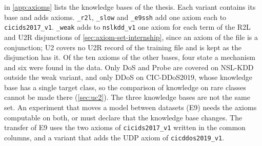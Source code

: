  in \cref{app:axioms} lists the knowledge bases of the thesis.
Each variant contains its base and adds axioms. \texttt{\_r2l}, \texttt{\_slow} and
\texttt{\_e9ssh} add one axiom each to \texttt{cicids2017\_v1}. \texttt{\_weak} adds to
\texttt{nslkdd\_v1} one axiom for each term of the R2L and U2R disjunctions of
\cref{sec:axiom-set-internship}, since an axiom of the file is a conjunction; U2
covers no U2R record of the training file and is kept as the disjunction has it. Of
the ten axioms of the other bases, four state a mechanism and six were found in the
data. Only DoS and Probe are covered on NSL-KDD outside the weak variant, and only
DDoS on CIC-DDoS2019, whose knowledge base has a single target class, so the
comparison of knowledge on rare classes cannot be made there (\cref{sec:uc2}). The
three knowledge bases are not the same set. An experiment that moves a model between
datasets (E9) needs the axioms computable on both, or must declare that the
knowledge base changes. The transfer of E9 uses the two axioms of
\texttt{cicids2017\_v1} written in the common columns, and a variant that adds the UDP
axiom of \texttt{cicddos2019\_v1}.

